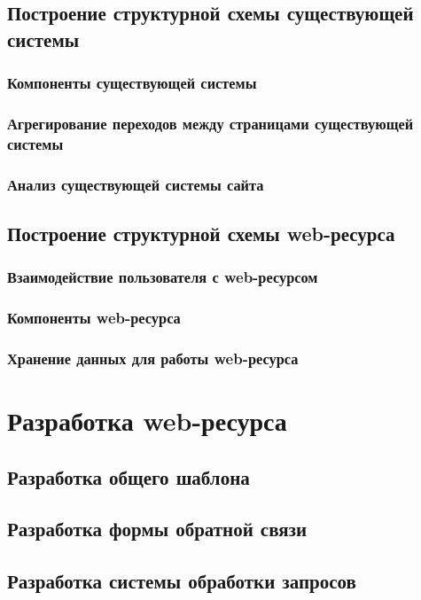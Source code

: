     \subsection{Построение структурной схемы существующей системы}
        \subsubsection{Компоненты существующей системы}
        \subsubsection{Агрегирование переходов между страницами существующей системы}
        \subsubsection{Анализ существующей системы сайта}

    \subsection{Построение структурной схемы web-ресурса}
        \subsubsection{Взаимодействие пользователя с web-ресурсом}
        \subsubsection{Компоненты web-ресурса}
        \subsubsection{Хранение данных для работы web-ресурса}

\section{Разработка web-ресурса}
    \subsection{Разработка общего шаблона}
    \subsection{Разработка формы обратной связи}
    \subsection{Разработка системы обработки запросов}
